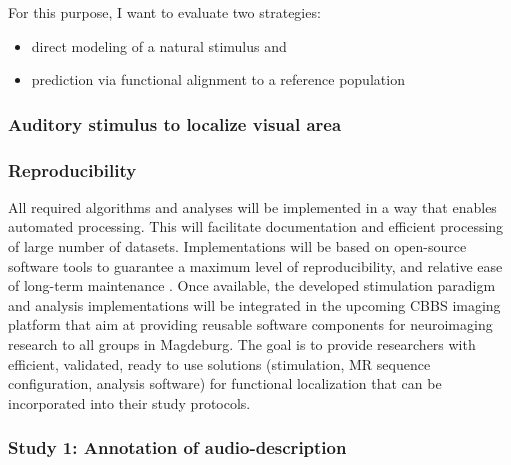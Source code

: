 %
For this purpose, I want to evaluate two strategies:

\begin{itemize}
    \item direct modeling of a natural stimulus and
    \item prediction via functional alignment to a reference population
\end{itemize}

\subsubsection{Auditory stimulus to localize visual area}




\subsubsection{Reproducibility}

%
All required algorithms and analyses will be implemented in a way that enables
automated processing.
%
This will facilitate documentation and efficient processing of large number of
datasets.
%
Implementations will be based on open-source software tools to guarantee a
maximum level of reproducibility, and relative ease of long-term maintenance
\citep{eglen2017toward}.
%
Once available, the developed stimulation paradigm and analysis implementations
will be integrated in the upcoming CBBS imaging platform that aim at providing
reusable software components for neuroimaging research to all groups in
Magdeburg.
%
The goal is to provide researchers with efficient, validated, ready to use
solutions (stimulation, MR sequence configuration, analysis software) for
functional localization that can be incorporated into their study protocols.


\subsubsection{Study 1: Annotation of audio-description}

